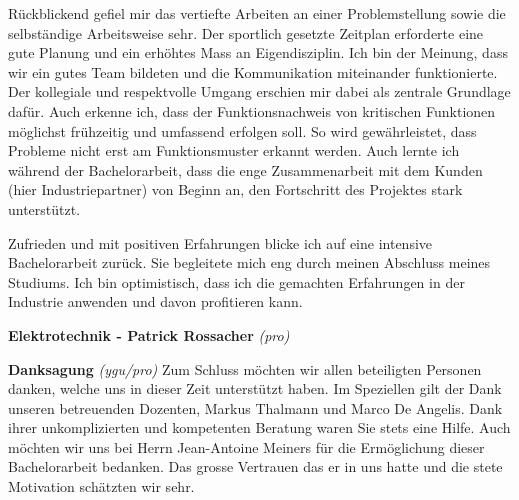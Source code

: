 Rückblickend gefiel mir das vertiefte Arbeiten an einer Problemstellung sowie die selbständige Arbeitsweise sehr. Der sportlich gesetzte Zeitplan erforderte eine gute Planung und ein erhöhtes Mass an Eigendisziplin. Ich bin der Meinung, dass wir ein gutes Team bildeten und die Kommunikation miteinander funktionierte. Der kollegiale und respektvolle Umgang erschien mir dabei als zentrale Grundlage dafür. Auch erkenne ich, dass der Funktionsnachweis von kritischen Funktionen möglichst frühzeitig und umfassend erfolgen soll. So wird gewährleistet, dass Probleme nicht erst am Funktionsmuster erkannt werden. Auch lernte ich während der Bachelorarbeit, dass die enge Zusammenarbeit mit dem Kunden (hier Industriepartner) von Beginn an, den Fortschritt des Projektes stark unterstützt.
\newline

Zufrieden und mit positiven Erfahrungen blicke ich auf eine intensive Bachelorarbeit zurück. Sie begleitete mich eng durch meinen Abschluss meines Studiums. Ich bin optimistisch, dass ich die gemachten Erfahrungen in der Industrie anwenden und davon profitieren kann.
\newline

\textbf{Elektrotechnik - Patrick Rossacher}
\newline
\textit{(pro)}
\newline	

\textbf{Danksagung}
\newline
\textit{(ygu/pro)} Zum Schluss möchten wir allen beteiligten Personen danken, welche uns in dieser Zeit unterstützt haben. Im Speziellen gilt der Dank unseren betreuenden Dozenten, Markus Thalmann und Marco De Angelis. Dank ihrer unkomplizierten und kompetenten Beratung waren Sie stets eine Hilfe. Auch möchten wir uns bei Herrn Jean-Antoine Meiners für die Ermöglichung dieser Bachelorarbeit bedanken. Das grosse Vertrauen das er in uns hatte und die stete Motivation schätzten wir sehr.

